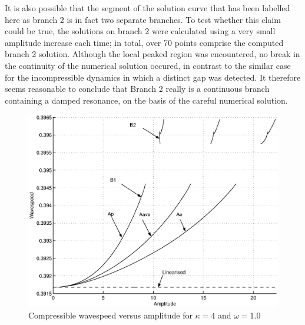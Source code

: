 It is also possible that the segment of the solution curve that has been labelled here as branch 2 is in fact two separate branches. To test whether this claim could be true, the solutions on branch 2 were calculated using a very small amplitude increase each time; in total, over 70 points comprise the computed branch 2 solution. Although the local peaked region was encountered, no break in the continuity of the numerical solution occured, in contrast to the similar case for the incompressible dynamics in which a distinct gap was detected. It therefore seems reasonable to conclude that Branch 2 really is a continuous branch containing a damped resonance, on the basis of the careful numerical solution.

\begin{figure}[tbp]
	\centering
		\includegraphics[scale=0.75]{IMAGES/CvsAk4w1com.eps}
	\caption{Compressible wavespeed versus amplitude for $\kappa=4$ and $\omega=1.0$}
	\label{fig:CvsAk4w1com}
\end{figure}

